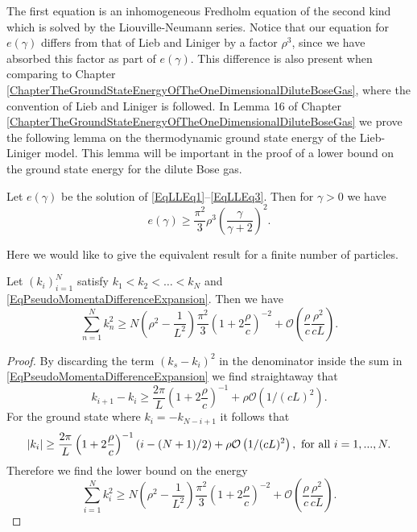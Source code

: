 The first equation is an inhomogeneous Fredholm equation of the second kind which is solved by the Liouville-Neumann series. Notice that our equation for  $ e(\gamma) $ differs from that of Lieb and Liniger by a factor $ \rho^3 $, since we have absorbed this factor as part of $ e(\gamma) $. This difference is also present when comparing to Chapter \ref{ChapterTheGroundStateEnergyOfTheOneDimensionalDiluteBoseGas}, where the convention of Lieb and Liniger is followed. In Lemma 16 of Chapter \ref{ChapterTheGroundStateEnergyOfTheOneDimensionalDiluteBoseGas} we prove the following lemma on the thermodynamic ground state energy of the Lieb-Liniger model. This lemma will be important in the proof of a lower bound on the ground state energy for the dilute Bose gas.
\begin{lemma}
	Let $ e(\gamma) $ be the solution of \eqref{EqLLEq1}--\eqref{EqLLEq3}. Then for $ \gamma>0 $ we have \begin{equation}
	e(\gamma)\geq \frac{\pi^2}{3}\rho^3\left(\frac{\gamma}{\gamma+2}\right)^2.
	\end{equation}
\end{lemma}
Here we would like to give the equivalent result for a finite number of particles.
\begin{lemma}
	Let $ (k_i)_{i=1}^{N} $ satisfy $ k_1<k_2<\ldots<k_N $ and \eqref{EqPseudoMomentaDifferenceExpansion}. Then we have 
	\begin{equation}
	\sum_{n=1}^{N}k_n^2\geq N\left(\rho^2-\frac{1}{L^2}\right)\frac{\pi^2}{3}\left(1+2\frac{\rho}{c}\right)^{-2}+\mathcal{O}\left(\frac{\rho}{c}\frac{\rho^2}{cL} \right).
	\end{equation}
\end{lemma}
\begin{proof}
	By discarding the term $ (k_s-k_i)^2 $ in the denominator inside the sum in \eqref{EqPseudoMomentaDifferenceExpansion} we find straightaway that
	$$k_{i+1}-k_i\geq \frac{2\pi}{L}\left(1+2\frac{\rho}{c}\right)^{-1}+\rho \mathcal{O}\left(1/(cL)^2\right). $$
For the ground state where $k_i=-k_{N-i+1}$ it follows that \begin{equation}
	\left\lvert k_i \right\rvert\geq \frac{2\pi}{L}\left(1+2\frac{\rho}{c}\right)^{-1}(i-(N+1)/2)+\rho \mathcal{O}\left(1/(cL)^2\right), \text{ for all } i=1,...,N.
\end{equation} 
Therefore we find the lower bound on the energy \begin{equation}
	\sum_{i=1}^{N}k_i^2\geq N\left(\rho^2-\frac{1}{L^2}\right)\frac{\pi^2}{3}\left(1+2\frac{\rho}{c}\right)^{-2}+\mathcal{O}\left(\frac{\rho}{c}\frac{\rho^2}{cL} \right).
\end{equation}
\end{proof}

